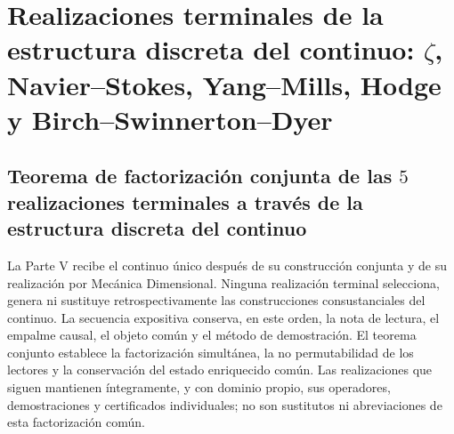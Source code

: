 \makeatletter
{}
\makeatother

\part{Realizaciones terminales de la estructura discreta del continuo: \texorpdfstring{\(\zeta\)}{zeta}, Navier--Stokes, Yang--Mills, Hodge y Birch--Swinnerton--Dyer}
\label{part:clausuras-terminales-definitiva}

\HMTFlushCurrentChapter
\chapter{Teorema de factorización conjunta de las \(5\) realizaciones terminales a través de la estructura discreta del continuo}
\label{chap:terminal-arquitectura-natural-comun}
La Parte V recibe el continuo único después de su construcción conjunta y de
su realización por Mecánica Dimensional. Ninguna realización terminal
selecciona, genera ni sustituye retrospectivamente las construcciones
consustanciales del continuo. La secuencia expositiva conserva, en este orden,
la nota de lectura, el empalme causal, el objeto común y el método de
demostración.
El teorema conjunto establece la factorización simultánea, la no
permutabilidad de los lectores y la conservación del estado enriquecido
común. Las realizaciones que siguen mantienen íntegramente, y con dominio
propio, sus operadores, demostraciones y certificados individuales; no son
sustitutos ni abreviaciones de esta factorización común.

\begingroup
\renewcommand{\chapter}[2][]{}%

\endgroup
